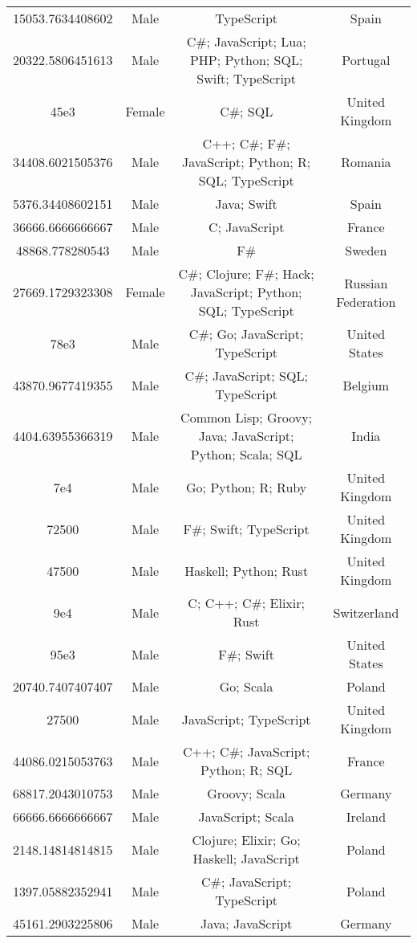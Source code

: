 \begin{center}
\begin{tabular}{ |c|c|c|c| }
15053.7634408602  &  Male  &  TypeScript  &  Spain  \\ 
20322.5806451613  &  Male  &  C\#; JavaScript; Lua; PHP; Python; SQL; Swift; TypeScript  &  Portugal  \\ 
45e3  &  Female  &  C\#; SQL  &  United Kingdom  \\ 
34408.6021505376  &  Male  &  C++; C\#; F\#; JavaScript; Python; R; SQL; TypeScript  &  Romania  \\ 
5376.34408602151  &  Male  &  Java; Swift  &  Spain  \\ 
36666.6666666667  &  Male  &  C; JavaScript  &  France  \\ 
48868.778280543  &  Male  &  F\#  &  Sweden  \\ 
27669.1729323308  &  Female  &  C\#; Clojure; F\#; Hack; JavaScript; Python; SQL; TypeScript  &  Russian Federation  \\ 
78e3  &  Male  &  C\#; Go; JavaScript; TypeScript  &  United States  \\ 
43870.9677419355  &  Male  &  C\#; JavaScript; SQL; TypeScript  &  Belgium  \\ 
4404.63955366319  &  Male  &  Common Lisp; Groovy; Java; JavaScript; Python; Scala; SQL  &  India  \\ 
7e4  &  Male  &  Go; Python; R; Ruby  &  United Kingdom  \\ 
72500  &  Male  &  F\#; Swift; TypeScript  &  United Kingdom  \\ 
47500  &  Male  &  Haskell; Python; Rust  &  United Kingdom  \\ 
9e4  &  Male  &  C; C++; C\#; Elixir; Rust  &  Switzerland  \\ 
95e3  &  Male  &  F\#; Swift  &  United States  \\ 
20740.7407407407  &  Male  &  Go; Scala  &  Poland  \\ 
27500  &  Male  &  JavaScript; TypeScript  &  United Kingdom  \\ 
44086.0215053763  &  Male  &  C++; C\#; JavaScript; Python; R; SQL  &  France  \\ 
68817.2043010753  &  Male  &  Groovy; Scala  &  Germany  \\ 
66666.6666666667  &  Male  &  JavaScript; Scala  &  Ireland  \\ 
2148.14814814815  &  Male  &  Clojure; Elixir; Go; Haskell; JavaScript  &  Poland  \\ 
1397.05882352941  &  Male  &  C\#; JavaScript; TypeScript  &  Poland  \\ 
45161.2903225806  &  Male  &  Java; JavaScript  &  Germany  \\ 

\end{tabular}
\end{center}
